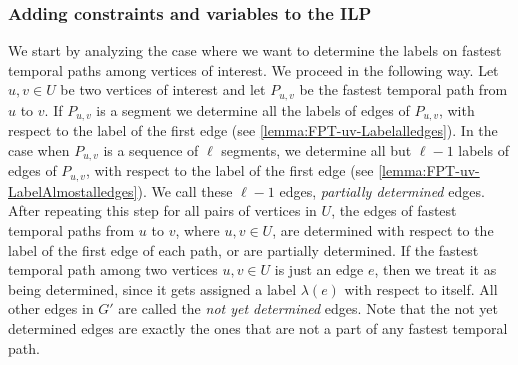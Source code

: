 \documentclass[a4paper,UKenglish,cleveref, autoref, thm-restate]{lipics-v2021}
\begin{document}
\subsubsection{Adding constraints and variables to the ILP}
We start by analyzing the case where we want to determine the labels on fastest temporal paths among vertices of interest.
We proceed in the following way.
Let $u,v \in U$ be two vertices of interest and let $P_{u,v}$ be the fastest temporal path from $u$ to $v$.
If $P_{u,v}$ is a segment we determine all the labels of edges of $P_{u,v}$, with respect to the label of the first edge (see \cref{lemma:FPT-uv-Labelalledges}).
In the case when $P_{u,v}$ is a sequence of $\ell$ segments, we determine all but $\ell - 1$ labels of edges of $P_{u,v}$, with respect to the label of the first edge (see \cref{lemma:FPT-uv-LabelAlmostalledges}).
We call these $\ell - 1$ edges, \emph{partially determined} edges.
After repeating this step for all pairs of vertices in $U$,
the edges of fastest temporal paths from $u$ to $v$, where $u,v \in U$, are determined with respect to the label of the first edge of each path,
or are partially determined.
If the fastest temporal path among two vertices $u,v \in U$ is just an edge $e$, then we treat it as being determined, since it gets assigned a label $\lambda(e)$ with respect to itself.
All other edges in $G'$ %
are called the \emph{not yet determined} edges.
Note that the not yet determined edges are exactly the ones that are not a part of any fastest temporal path.
\end{document}
